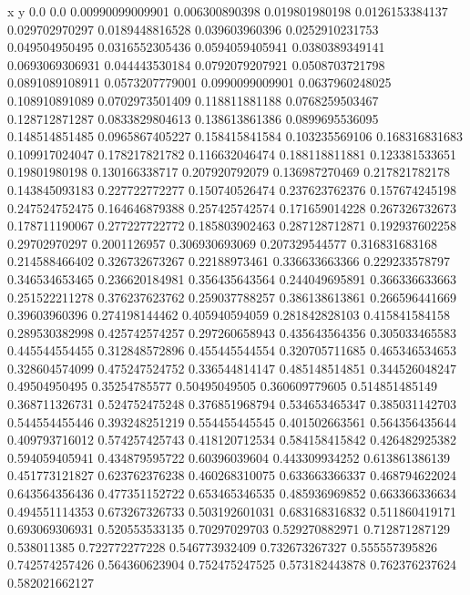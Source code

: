               x                y
            0.0              0.0
0.00990099009901   0.006300890398
 0.019801980198  0.0126153384137
 0.029702970297  0.0189448816528
 0.039603960396  0.0252910231753
 0.049504950495  0.0316552305436
0.0594059405941  0.0380389349141
0.0693069306931   0.044443530184
0.0792079207921  0.0508703721798
0.0891089108911  0.0573207779001
0.0990099009901  0.0637960248025
 0.108910891089  0.0702973501409
 0.118811881188  0.0768259503467
 0.128712871287  0.0833829804613
 0.138613861386  0.0899695536095
 0.148514851485  0.0965867405227
 0.158415841584   0.103235569106
 0.168316831683   0.109917024047
 0.178217821782   0.116632046474
 0.188118811881   0.123381533651
  0.19801980198   0.130166338717
 0.207920792079   0.136987270469
 0.217821782178   0.143845093183
 0.227722772277   0.150740526474
 0.237623762376   0.157674245198
 0.247524752475   0.164646879388
 0.257425742574   0.171659014228
 0.267326732673   0.178711190067
 0.277227722772   0.185803902463
 0.287128712871   0.192937602258
  0.29702970297     0.2001126957
 0.306930693069   0.207329544577
 0.316831683168   0.214588466402
 0.326732673267    0.22188973461
 0.336633663366   0.229233578797
 0.346534653465   0.236620184981
 0.356435643564   0.244049695891
 0.366336633663   0.251522211278
 0.376237623762   0.259037788257
 0.386138613861   0.266596441669
  0.39603960396   0.274198144462
 0.405940594059   0.281842828103
 0.415841584158   0.289530382998
 0.425742574257   0.297260658943
 0.435643564356   0.305033465583
 0.445544554455   0.312848572896
 0.455445544554   0.320705711685
 0.465346534653   0.328604574099
 0.475247524752   0.336544814147
 0.485148514851   0.344526048247
  0.49504950495    0.35254785577
  0.50495049505   0.360609779605
 0.514851485149   0.368711326731
 0.524752475248   0.376851968794
 0.534653465347   0.385031142703
 0.544554455446   0.393248251219
 0.554455445545   0.401502663561
 0.564356435644   0.409793716012
 0.574257425743   0.418120712534
 0.584158415842   0.426482925382
 0.594059405941   0.434879595722
  0.60396039604   0.443309934252
 0.613861386139   0.451773121827
 0.623762376238   0.460268310075
 0.633663366337   0.468794622024
 0.643564356436   0.477351152722
 0.653465346535   0.485936969852
 0.663366336634   0.494551114353
 0.673267326733   0.503192601031
 0.683168316832   0.511860419171
 0.693069306931   0.520553533135
  0.70297029703   0.529270882971
 0.712871287129      0.538011385
 0.722772277228   0.546773932409
 0.732673267327   0.555557395826
 0.742574257426   0.564360623904
 0.752475247525   0.573182443878
 0.762376237624   0.582021662127

